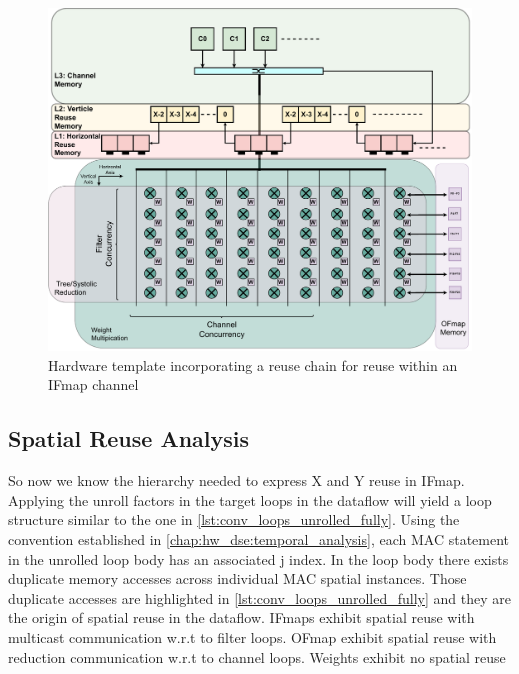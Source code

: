 \begin{figure}[]
    \centering
    \includegraphics[scale=0.4]{fig/reuse_chain.pdf}
    \caption{Hardware template incorporating a reuse chain for reuse within an IFmap channel }
    \label{fig:reuse_chain}
\end{figure}


\subsection{Spatial Reuse Analysis}
\label{chap:hw_dse:spatial_reuse_analysis}

So now we know the hierarchy needed to express X and Y reuse in IFmap. Applying
the unroll factors in the target loops in the dataflow will yield a loop
structure similar to the one in \ref{lst:conv_loops_unrolled_fully}. Using the
convention established in \ref{chap:hw_dse:temporal_analysis}, each
\ac{MAC} statement in the unrolled loop body has an associated j index. In the
loop body there exists duplicate memory accesses across individual \ac{MAC}
spatial instances. Those duplicate accesses are highlighted in
\autoref{lst:conv_loops_unrolled_fully} and they are the origin of spatial reuse
in the dataflow. IFmaps exhibit spatial reuse with multicast communication w.r.t
to filter loops. OFmap exhibit spatial reuse with reduction communication
w.r.t to channel loops. Weights exhibit no spatial reuse 
 

